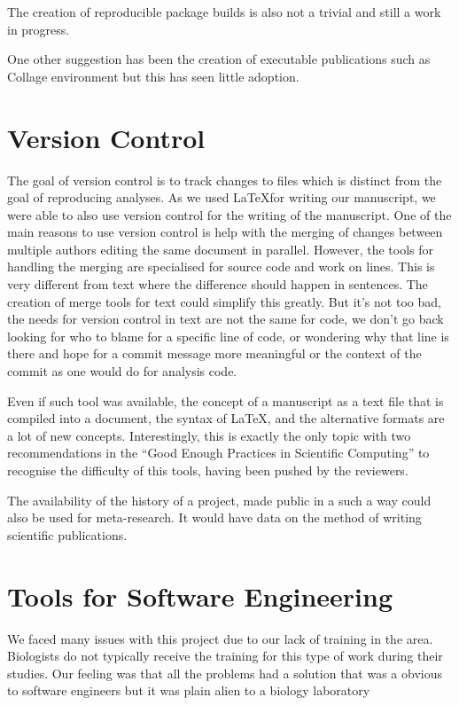 The creation of reproducible package builds is also not a trivial and
still a work in progress.

One other suggestion has been the creation of executable publications
such as Collage environment but this has seen little adoption.

\section{Version Control}

The goal of version control is to track changes to files which is
distinct from the goal of reproducing analyses.  As we used \LaTeX for
writing our manuscript, we were able to also use version control for
the writing of the manuscript.  One of the main reasons to use version
control is help with the merging of changes between multiple authors
editing the same document in parallel.  However, the tools for
handling the merging are specialised for source code and work on
lines.  This is very different from text where the difference should
happen in sentences.  The creation of merge tools for text could
simplify this greatly.  But it's not too bad, the needs for version
control in text are not the same for code, we don't go back looking
for who to blame for a specific line of code, or wondering why that
line is there and hope for a commit message more meaningful or the
context of the commit as one would do for analysis code.

Even if such tool was available, the concept of a manuscript as a text
file that is compiled into a document, the syntax of \LaTeX, and the
alternative formats are a lot of new concepts.  Interestingly, this is
exactly the only topic with two recommendations in the ``Good Enough
Practices in Scientific Computing'' to recognise the difficulty of
this tools, having been pushed by the reviewers.

The availability of the history of a project, made public in a such a
way could also be used for meta-research.  It would have data on the
method of writing scientific publications.

\section{Tools for Software Engineering}

We faced many issues with this project due to our lack of training in
the area.  Biologists do not typically receive the training for this
type of work during their studies.  Our feeling was that all the
problems had a solution that was a obvious to software engineers but
it was plain alien to a biology laboratory

